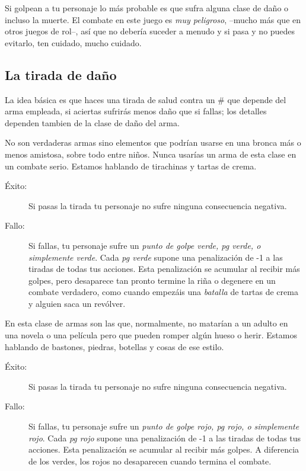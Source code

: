 Si golpean a tu personaje lo más probable es que sufra alguna clase
de daño o incluso la muerte. El combate en este juego es \emph{muy peligroso},
--mucho más que en otros juegos de rol--, así que no debería suceder a menudo
y si pasa y no puedes evitarlo, ten cuidado, mucho cuidado.

\subsection{La tirada de daño}

La idea básica es que haces una tirada de salud contra un \# que depende del
arma empleada, si aciertas sufrirás menos daño que si fallas; los detalles 
dependen tambien de la clase de daño del arma.


No son verdaderas armas sino elementos que podrían usarse en una bronca más o menos
amistosa, sobre todo entre niños. Nunca usarías un arma de esta clase en un combate
serio. Estamos hablando de tirachinas y tartas de crema.

\begin{description}

\item[Éxito:] Si pasas la tirada tu personaje no sufre ninguna consecuencia negativa.

\item[Fallo:] Si fallas, tu personaje sufre un \emph{punto de golpe verde, pg verde, o simplemente verde}. 
Cada \emph{pg verde} supone una penalización de -1 a las tiradas de todas tus acciones. Esta penalización
se acumular al recibir más golpes, pero desaparece tan pronto termine la riña o degenere en un combate verdadero,
como cuando empezáis una \emph{batalla} de tartas de crema y alguien saca un revólver. 

\end{description}


En esta clase de armas son las que, normalmente, no matarían a un adulto en una novela
o una película pero que pueden romper algún hueso o herir. Estamos hablando de bastones, 
piedras, botellas y cosas de ese estilo. 

\begin{description}

\item[Éxito:] Si pasas la tirada tu personaje no sufre ninguna consecuencia negativa.

\item[Fallo:] Si fallas, tu personaje sufre un \emph{punto de golpe rojo, pg rojo, o simplemente rojo}. 
Cada \emph{pg rojo} supone una penalización de -1 a las tiradas de todas tus acciones. Esta penalización
se acumular al recibir más golpes. A diferencia de los verdes, los rojos no desaparecen cuando termina 
el combate.

\end{description}

